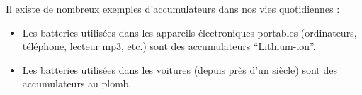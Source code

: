 \documentclass[11pt,a4paper]{article}
\begin{document}
Il existe de nombreux exemples d'accumulateurs dans nos vies quotidiennes : 
\begin{itemize}
    \item Les batteries utilisées dans les appareils électroniques portables (ordinateurs, téléphone, lecteur mp3, etc.) sont des accumulateurs ``Lithium-ion''. 
    \item Les batteries utilisées dans les voitures (depuis près d'un siècle) sont des accumulateurs au plomb. 
\end{itemize}

\end{document}

